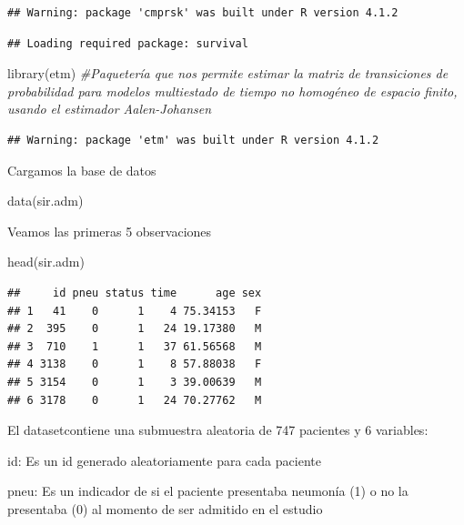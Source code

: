\documentclass[
]{article}
\newenvironment{Shaded}{\begin{snugshade}}{\end{snugshade}}
\newcommand{\CommentTok}[1]{\textcolor[rgb]{0.56,0.35,0.01}{\textit{#1}}}
\newcommand{\FunctionTok}[1]{\textcolor[rgb]{0.00,0.00,0.00}{#1}}
\newcommand{\NormalTok}[1]{#1}
\begin{document}
\begin{verbatim}
## Warning: package 'cmprsk' was built under R version 4.1.2
\end{verbatim}

\begin{verbatim}
## Loading required package: survival
\end{verbatim}

\begin{Shaded}
\begin{Highlighting}[]
\FunctionTok{library}\NormalTok{(etm) }\CommentTok{\#Paquetería que nos permite estimar la matriz de transiciones de probabilidad para modelos multiestado de tiempo no homogéneo de espacio finito, usando el estimador Aalen{-}Johansen}
\end{Highlighting}
\end{Shaded}

\begin{verbatim}
## Warning: package 'etm' was built under R version 4.1.2
\end{verbatim}

Cargamos la base de datos

\begin{Shaded}
\begin{Highlighting}[]
\FunctionTok{data}\NormalTok{(sir.adm)}
\end{Highlighting}
\end{Shaded}

Veamos las primeras 5 observaciones

\begin{Shaded}
\begin{Highlighting}[]
\FunctionTok{head}\NormalTok{(sir.adm)}
\end{Highlighting}
\end{Shaded}

\begin{verbatim}
##     id pneu status time      age sex
## 1   41    0      1    4 75.34153   F
## 2  395    0      1   24 19.17380   M
## 3  710    1      1   37 61.56568   M
## 4 3138    0      1    8 57.88038   F
## 5 3154    0      1    3 39.00639   M
## 6 3178    0      1   24 70.27762   M
\end{verbatim}

El datasetcontiene una submuestra aleatoria de 747 pacientes y 6
variables:

id: Es un id generado aleatoriamente para cada paciente

pneu: Es un indicador de si el paciente presentaba neumonía (1) o no la
presentaba (0) al momento de ser admitido en el estudio
\end{document}
